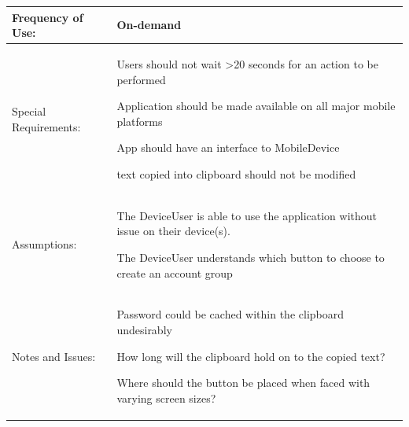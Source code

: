 \documentclass[stu]{apa7}
\newcommand{\nextitem}{\par\hspace*{\labelsep}\textbullet\hspace*{\labelsep}}
\begin{document}
{{{{\begin{xltabular}{\textwidth}{|l|X|}
              Frequency of Use: & On-demand \\ \hline

              Special Requirements: & \nextitem Users should not wait >20 seconds for an action to be performed
                                      \nextitem Application should be made available on all major mobile platforms
                                      \nextitem App should have an interface to MobileDevice
                                      \nextitem text copied into clipboard should not be modified \\ \hline


              Assumptions: & \nextitem The DeviceUser is able to use the application without issue on their device(s).
                             \nextitem The DeviceUser understands which button to choose to create an account group \\ \hline

              Notes and Issues: & \nextitem Password could be cached within the clipboard undesirably
                                  \nextitem How long will the clipboard hold on to the copied text?
                                  \nextitem Where should the button be placed when faced with varying screen sizes? \\ \hline

\end{xltabular}

%
%
%
%
%
%
%
%
%
%
%
%
%
%
%
%
%


}}}}
\end{document}
